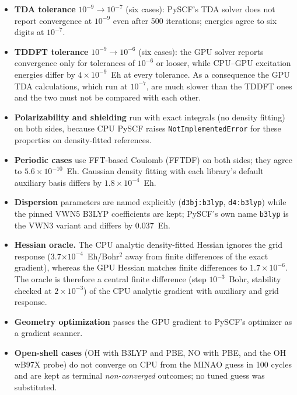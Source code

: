 \begin{itemize}[leftmargin=*,itemsep=1pt]
\item \textbf{TDA tolerance} $10^{-9}\to10^{-7}$ (six cases): PySCF's TDA solver does not report convergence at $10^{-9}$ even after 500 iterations; energies agree to six digits at $10^{-7}$.
\item \textbf{TDDFT tolerance} $10^{-9}\to10^{-6}$ (six cases): the GPU solver reports convergence only for tolerances of $10^{-6}$ or looser, while CPU--GPU excitation energies differ by $4\times10^{-9}$~Eh at every tolerance. As a consequence the GPU TDA calculations, which run at $10^{-7}$, are much slower than the TDDFT ones and the two must not be compared with each other.
\item \textbf{Polarizability and shielding} run with exact integrals (no density fitting) on both sides, because CPU PySCF raises \texttt{NotImplementedError} for these properties on density-fitted references.
\item \textbf{Periodic cases} use FFT-based Coulomb (FFTDF) on both sides; they agree to $5.6\times10^{-10}$~Eh. Gaussian density fitting with each library's default auxiliary basis differs by $1.8\times10^{-4}$~Eh.
\item \textbf{Dispersion} parameters are named explicitly (\texttt{d3bj:b3lyp}, \texttt{d4:b3lyp}) while the pinned VWN5 B3LYP coefficients are kept; PySCF's own name \texttt{b3lyp} is the VWN3 variant and differs by 0.037~Eh.
\item \textbf{Hessian oracle.} The CPU analytic density-fitted Hessian ignores the grid response (3.7$\times10^{-4}$~Eh/Bohr$^2$ away from finite differences of the exact gradient), whereas the GPU Hessian matches finite differences to $1.7\times10^{-6}$. The oracle is therefore a central finite difference (step $10^{-3}$~Bohr, stability checked at $2\times10^{-3}$) of the CPU analytic gradient with auxiliary and grid response.
\item \textbf{Geometry optimization} passes the GPU gradient to PySCF's optimizer as a gradient scanner.
\item \textbf{Open-shell cases} (OH with B3LYP and PBE, NO with PBE, and the OH wB97X probe) do not converge on CPU from the MINAO guess in 100 cycles and are kept as terminal \emph{non-converged} outcomes; no tuned guess was substituted.
\end{itemize}

